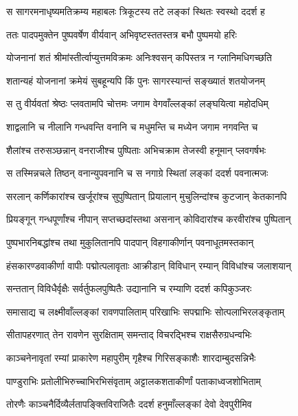 
\twolineshloka
{स सागरमनाधृष्यमतिक्रम्य महाबलः}
{त्रिकूटस्य तटे लङ्कां स्थितः स्वस्थो ददर्श ह} %

\twolineshloka
{ततः पादपमुक्तेन पुष्पवर्षेण वीर्यवान्}
{अभिवृष्टस्ततस्तत्र बभौ पुष्पमयो हरिः} %

\twolineshloka
{योजनानां शतं श्रीमांस्तीर्त्वाप्युत्तमविक्रमः}
{अनिःश्वसन् कपिस्तत्र न ग्लानिमधिगच्छति} %

\twolineshloka
{शतान्यहं योजनानां क्रमेयं सुबहून्यपि}
{किं पुनः सागरस्यान्तं सङ्ख्यातं शतयोजनम्} %

\twolineshloka
{स तु वीर्यवतां श्रेष्ठः प्लवतामपि चोत्तमः}
{जगाम वेगवाँल्लङ्कां लङ्घयित्वा महोदधिम्} %

\twolineshloka
{शाद्वलानि च नीलानि गन्धवन्ति वनानि च}
{मधुमन्ति च मध्येन जगाम नगवन्ति च} %

\twolineshloka
{शैलांश्च तरुसञ्छन्नान् वनराजीश्च पुष्पिताः}
{अभिचक्राम तेजस्वी हनूमान् प्लवगर्षभः} %

\twolineshloka
{स तस्मिन्नचले तिष्ठन् वनान्युपवनानि च}
{स नगाग्रे स्थितां लङ्कां ददर्श पवनात्मजः} %

\twolineshloka
{सरलान् कर्णिकारांश्च खर्जूरांश्च सुपुष्पितान्}
{प्रियालान् मुचुलिन्दांश्च कुटजान् केतकानपि} %

\twolineshloka
{प्रियङ्गून् गन्धपूर्णांश्च नीपान् सप्तच्छदांस्तथा}
{असनान् कोविदारांश्च करवीरांश्च पुष्पितान्} %

\twolineshloka
{पुष्पभारनिबद्धांश्च तथा मुकुलितानपि}
{पादपान् विहगाकीर्णान् पवनाधूतमस्तकान्} %

\twolineshloka
{हंसकारण्डवाकीर्णा वापीः पद्मोत्पलावृताः}
{आक्रीडान् विविधान् रम्यान् विविधांश्च जलाशयान्} %

\twolineshloka
{सन्ततान् विविधैर्वृक्षैः सर्वर्तुफलपुष्पितैः}
{उद्यानानि च रम्याणि ददर्श कपिकुञ्जरः} %

\twolineshloka
{समासाद्य च लक्ष्मीवाँल्लङ्कां रावणपालिताम्}
{परिखाभिः सपद्माभिः सोत्पलाभिरलङ्कृताम्} %

\twolineshloka
{सीतापहरणात् तेन रावणेन सुरक्षिताम्}
{समन्ताद् विचरद्भिश्च राक्षसैरुग्रधन्वभिः} %

\twolineshloka
{काञ्चनेनावृतां रम्यां प्राकारेण महापुरीम्}
{गृहैश्च गिरिसङ्काशैः शारदाम्बुदसन्निभैः} %

\twolineshloka
{पाण्डुराभिः प्रतोलीभिरुच्चाभिरभिसंवृताम्}
{अट्टालकशताकीर्णां पताकाध्वजशोभिताम्} %

\twolineshloka
{तोरणैः काञ्चनैर्दिव्यैर्लतापङ्क्तिविराजितैः}
{ददर्श हनुमाँल्लङ्कां देवो देवपुरीमिव} %

